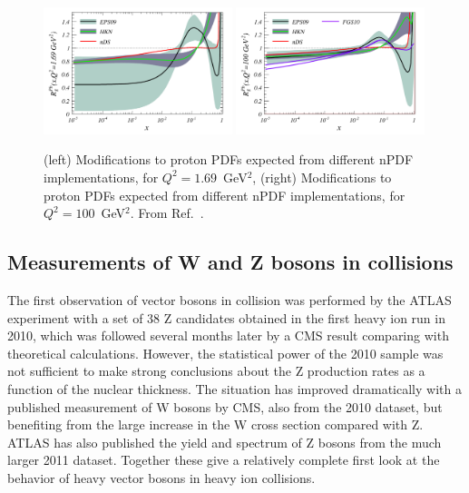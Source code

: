 \begin{figure}[t]
\begin{center}
\includegraphics[width=0.49\textwidth]{electroweak_figs/gluonsnew.pdf}
\includegraphics[width=0.49\textwidth]{electroweak_figs/gluonsnew100.pdf}
\caption[]{
(left) Modifications to proton PDFs expected from different nPDF implementations, for $Q^2=1.69$~GeV$^2$,
(right) Modifications to proton PDFs expected from different nPDF implementations, for $Q^2=100$~GeV$^2$.
From Ref.~\cite{Salgado:2011wc}.
}
\label{fig:pas:salgado}
\end{center}
\end{figure}

\subsection{Measurements of W and Z bosons in \PbPb collisions}

The first observation of vector bosons in \PbPb collision was performed by the ATLAS
experiment with a set of 38 Z candidates obtained in the first heavy ion run in 2010, which
was followed several months later by a CMS result comparing with theoretical calculations.
However, the statistical power of the 2010 sample was not sufficient to make strong conclusions
about the Z production rates as a function of the nuclear thickness.
The situation has improved dramatically with a published measurement of W bosons by CMS, also from the
2010 dataset, but benefiting from the large increase in the W cross section compared with Z.
ATLAS has also published the yield and spectrum of Z bosons from the much larger 2011 \PbPb dataset.
Together these give a relatively complete first look at the behavior of heavy vector bosons in
heavy ion collisions.


